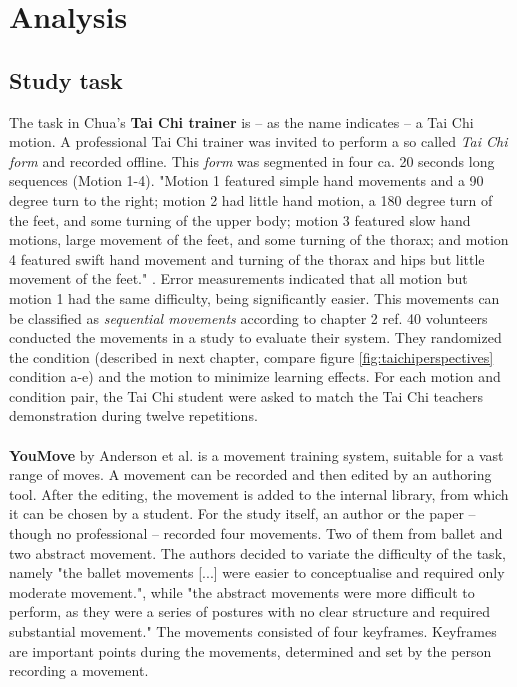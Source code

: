 \section{Analysis}
\subsection{Study task}
The task in Chua's \cite{Chua} \textbf{Tai Chi trainer} is \--- as the name indicates \--- a Tai Chi motion. A professional Tai Chi trainer was invited to perform a so called \textit{Tai Chi form} and recorded offline. This \textit{form} was segmented in four ca. 20 seconds long sequences (Motion 1-4). "Motion 1 featured simple hand movements and a 90 degree turn to the right; motion 2 had little hand motion, a 180 degree turn of the feet, and some turning of the upper body; motion 3 featured slow hand motions, large movement of the feet, and some turning of the thorax; and motion 4 featured swift hand movement and turning of the thorax and hips but little movement of the feet." \cite{Chua}. Error measurements indicated that all motion but motion 1 had the same difficulty, being significantly easier. This movements can be classified as \textit{sequential movements} according to chapter 2 \todo ref. 40 volunteers conducted the movements in a study to evaluate their system. They randomized the condition (described in next chapter, compare figure \ref{fig:taichiperspectives} condition a-e) and the motion to minimize learning effects. For each motion and condition pair, the Tai Chi student were asked to match the Tai Chi teachers demonstration during twelve repetitions.\\ \\
\textbf{YouMove} by Anderson et al. \cite{Anderson2013} is a movement training system, suitable for a vast range of moves. A movement can be recorded and then edited by an authoring tool. After the editing, the movement is added to the internal library, from which it can be chosen by a student. For the study itself, an author or the paper \--- though no professional \--- recorded four movements. Two of them from ballet and two abstract movement. The authors decided to variate the difficulty of the task, namely "the ballet movements [...] were easier to conceptualise and required only moderate movement.", while "the abstract movements were more difficult to perform, as they were a series of postures with no clear structure and required substantial movement." The movements consisted of four keyframes. Keyframes are important points during the movements, determined and set by the person recording a movement.\\ \\
